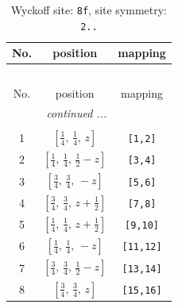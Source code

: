 \documentclass[fleqn,8pt]{jsarticle}
\begin{document}
\begin{longtable}{ccc}
\caption{Wyckoff site: {\tt 8f}, site symmetry: {\tt 2..}}
 \\
 \hline \hline
No. & position & mapping \\ \hline \endfirsthead

\multicolumn{2}{l}{\tablename\ \thetable{}} \\
 \hline \hline
No. & position & mapping \\ \hline \endhead

 \hline \hline
\multicolumn{2}{r}{\footnotesize\it continued ...} \\ \endfoot

 \hline \hline
\multicolumn{2}{r}{} \\ \endlastfoot

1 & $\left[ \frac{1}{4},\, \frac{1}{4},\, z \right]$ & {\tt [1,2]} \\ \hline
2 & $\left[ \frac{1}{4},\, \frac{1}{4},\, \frac{1}{2} - z \right]$ & {\tt [3,4]} \\ \hline
3 & $\left[ \frac{3}{4},\, \frac{3}{4},\, - z \right]$ & {\tt [5,6]} \\ \hline
4 & $\left[ \frac{3}{4},\, \frac{3}{4},\, z + \frac{1}{2} \right]$ & {\tt [7,8]} \\ \hline
5 & $\left[ \frac{1}{4},\, \frac{1}{4},\, z + \frac{1}{2} \right]$ & {\tt [9,10]} \\ \hline
6 & $\left[ \frac{1}{4},\, \frac{1}{4},\, - z \right]$ & {\tt [11,12]} \\ \hline
7 & $\left[ \frac{3}{4},\, \frac{3}{4},\, \frac{1}{2} - z \right]$ & {\tt [13,14]} \\ \hline
8 & $\left[ \frac{3}{4},\, \frac{3}{4},\, z \right]$ & {\tt [15,16]} \\
\end{longtable}
\renewcommand{\arraystretch}{1.2}
\end{document}
